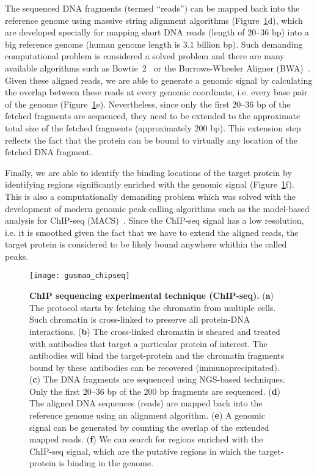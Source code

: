 The sequenced DNA fragments (termed ``reads'') can be mapped back into the reference genome using massive string alignment algorithms (Figure~\ref{fig:gusmao_chipseq}d), which are developed specially for mapping short DNA reads (length of $20$--$36$ bp) into a big reference genome (human genome length is \approxy$3.1$ billion bp). Such demanding computational problem is considered a solved problem and there are many available algorithms such as Bowtie~2~\cite{langmead2012} or the Burrows-Wheeler Aligner (BWA)~\cite{li2009b}. Given these aligned reads, we are able to generate a genomic signal by calculating the overlap between these reads at every genomic coordinate, i.e. every base pair of the genome (Figure~\ref{fig:gusmao_chipseq}e). Nevertheless, since only the first $20$--$36$ bp of the fetched fragments are sequenced, they need to be extended to the approximate total size of the fetched fragments (approximately $200$ bp). This extension step reflects the fact that the protein can be bound to virtually any location of the fetched DNA fragment.

Finally, we are able to identify the binding locations of the target protein by identifying regions significantly enriched with the genomic signal (Figure~\ref{fig:gusmao_chipseq}f). This is also a computationally demanding problem which was solved with the development of modern genomic peak-calling algorithms such as the model-based analysis for ChIP-seq (MACS)~\cite{zhang2008}. Since the ChIP-seq signal has a low resolution, i.e. it is smoothed given the fact that we have to extend the aligned reads, the target protein is considered to be likely bound anywhere whithin the called peaks.

\begin{figure}[h!]
\centering
\texttt{[image: gusmao\_chipseq]}
\caption[ChIP sequencing experimental technique (ChIP-seq)]{\textbf{ChIP sequencing experimental technique (ChIP-seq).} (\textbf{a}) The protocol starts by fetching the chromatin from multiple cells. Such chromatin is cross-linked to preserve all protein-DNA interactions. (\textbf{b}) The cross-linked chromatin is sheared and treated with antibodies that target a particular protein of interest. The antibodies will bind the target-protein and the chromatin fragments bound by these antibodies can be recovered (immunoprecipitated). (\textbf{c}) The DNA fragments are sequenced using NGS-based techniques. Only the first $20$--$36$ bp of the \approxy$200$ bp fragments are sequenced. (\textbf{d}) The aligned DNA sequences (reads) are mapped back into the reference genome using an alignment algorithm. (\textbf{e}) A genomic signal can be generated by counting the overlap of the extended mapped reads. (\textbf{f}) We can search for regions enriched with the ChIP-seq signal, which are the putative regions in which the target-protein is binding in the genome.}
\label{fig:gusmao_chipseq}
\end{figure}

